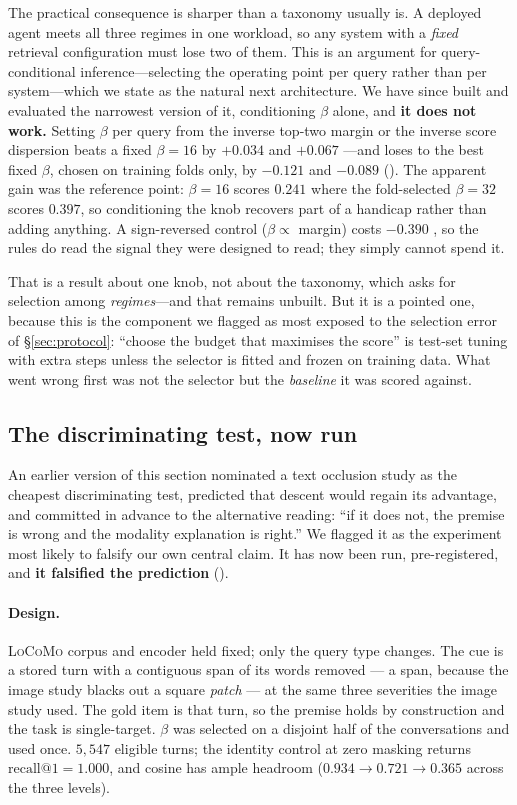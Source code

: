 The practical consequence is sharper than a taxonomy usually is. A deployed agent meets all
three regimes in one workload, so any system with a \emph{fixed} retrieval configuration must
lose two of them. This is an argument for query-conditional inference---selecting the
operating point per query rather than per system---which we state as the natural next
architecture. We have since built and evaluated the narrowest version of it, conditioning
$\beta$ alone, and \textbf{it does not work.} Setting $\beta$ per query from the inverse
top-two margin or the inverse score dispersion beats a fixed $\beta{=}16$ by $+0.034$
 and $+0.067$ ---and loses to the best fixed
$\beta$, chosen on training folds only, by $-0.121$  and $-0.089$
 (). The apparent gain was the reference point: $\beta{=}16$
scores $0.241$ where the fold-selected $\beta{=}32$ scores $0.397$, so conditioning the
knob recovers part of a handicap rather than adding anything. A sign-reversed control
($\beta \propto$ margin) costs $-0.390$ , so the rules do read the
signal they were designed to read; they simply cannot spend it.

That is a result about one knob, not about the taxonomy, which asks for selection among
\emph{regimes}---and that remains unbuilt. But it is a pointed one, because this is the
component we flagged as most exposed to the selection error of \S\ref{sec:protocol}:
``choose the budget that maximises the score'' is test-set tuning with extra steps unless
the selector is fitted and frozen on training data. What went wrong first was not the
selector but the \emph{baseline} it was scored against.

\subsection{The discriminating test, now run}
\label{sec:occlusion}

An earlier version of this section nominated a text occlusion study as the cheapest
discriminating test, predicted that descent would regain its advantage, and committed in
advance to the alternative reading: ``if it does not, the premise is wrong and the modality
explanation is right.'' We flagged it as the experiment most likely to falsify our own
central claim. It has now been run, pre-registered, and \textbf{it falsified the
prediction} ().

\paragraph{Design.} \textsc{LoCoMo} corpus and encoder held fixed; only the query type
changes. The cue is a stored turn with a contiguous span of its words removed --- a span,
because the image study blacks out a square \emph{patch} --- at the same three severities
the image study used. The gold item is that turn, so the premise holds by construction and
the task is single-target. $\beta$ was selected on a disjoint half of the conversations and
used once. $5{,}547$ eligible turns; the identity control at zero masking returns
$\mathrm{recall}@1 = 1.000$, and cosine has ample headroom ($0.934 \to 0.721 \to 0.365$
across the three levels).


